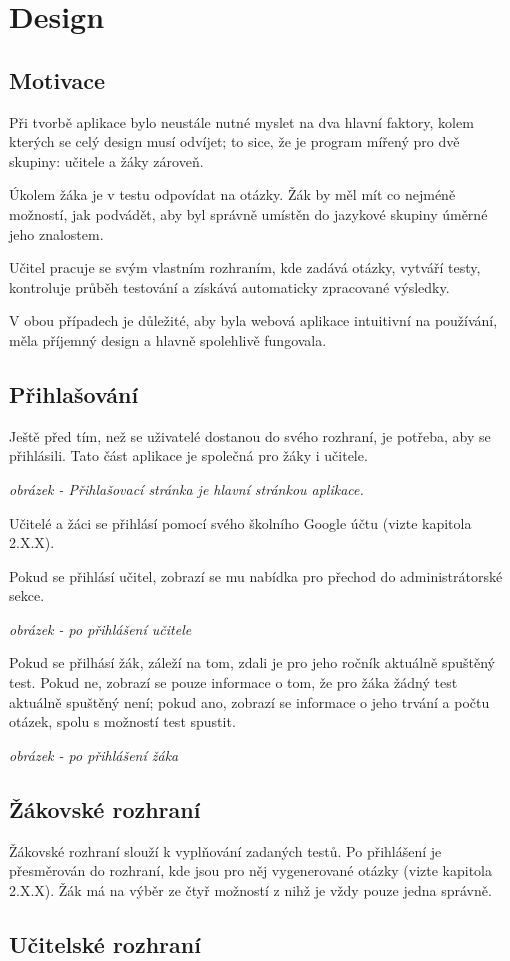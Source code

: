 \hypertarget{Design}{\chapter{Design}}

\section{Motivace}

Při tvorbě aplikace bylo neustále nutné myslet na dva hlavní faktory, kolem kterých se celý design musí odvíjet; to sice, že je program mířený pro dvě skupiny: učitele a žáky zároveň.

Úkolem žáka je v testu odpovídat na otázky. Žák by měl mít co nejméně možností, jak podvádět, aby byl správně umístěn do jazykové skupiny úměrné jeho znalostem.

Učitel pracuje se svým vlastním rozhraním, kde zadává otázky, vytváří testy, kontroluje průběh testování a získává automaticky zpracované výsledky.

V obou případech je důležité, aby byla webová aplikace intuitivní na používání, měla příjemný design a hlavně spolehlivě fungovala.

\section{Přihlašování}

Ještě před tím, než se uživatelé dostanou do svého rozhraní, je potřeba, aby se přihlásili. Tato část aplikace je společná pro žáky i učitele. 

\textit{obrázek - Přihlašovací stránka je hlavní stránkou aplikace. }

Učitelé a žáci se přihlásí pomocí svého školního Google účtu (vizte kapitola 2.X.X).

Pokud se přihlásí učitel, zobrazí se mu nabídka pro přechod do administrátorské sekce.

\textit{obrázek - po přihlášení učitele}

Pokud se přilhásí žák, záleží na tom, zdali je pro jeho ročník aktuálně spuštěný test. Pokud ne, zobrazí se pouze informace o tom, že pro žáka žádný test aktuálně spuštěný není; pokud ano, zobrazí se informace o jeho trvání a počtu otázek, spolu s možností test spustit.

\textit{obrázek - po přihlášení žáka}

\section{Žákovské rozhraní}

Žákovské rozhraní slouží k vyplňování zadaných testů. Po přihlášení je přesměrován do rozhraní, kde jsou pro něj vygenerované otázky (vizte kapitola 2.X.X). Žák má na výběr ze čtyř možností z nihž je vždy pouze jedna správně.

\section{Učitelské rozhraní}
